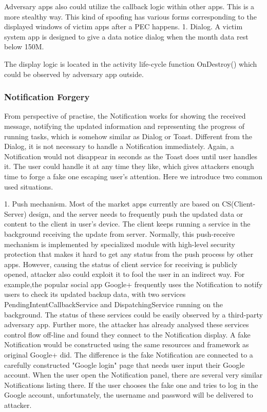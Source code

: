 \documentclass{sig-alternate-05-2015}
\begin{document}
 

Adversary apps also could utilize the callback logic within other apps. This is a more stealthy way. This kind of spoofing has various forms corresponding to the displayed windows of victim apps after a PEC happens.
1. Dialog. A victim system app is designed to give a data notice dialog when the month data rest below 150M. 

The display logic is located in the activity life-cycle function OnDestroy() which could be observed by adversary app outside. 

\subsubsection{Notification Forgery}
From perspective of practise, the Notification works for showing the received message, notifying the updated information and representing the progress of running tasks, which is somehow similar as Dialog or Toast. Different from the Dialog, it is not necessary to handle a Notification immediately. Again, a Notification would not disappear in seconds as the Toast does until user handles it. The user could handle it at any time they like, which gives attackers enough time to forge a fake one escaping user's attention. Here we introduce two common used situations. 

1. Push mechanism. Most of the market apps currently are based on CS(Client-Server) design, and the server needs to frequently push the updated data or content to the client in user's device. The client keeps running a service in the background receiving the update from server. Normally, this push-receive mechanism is implemented by specialized module with high-level security protection that makes it hard to get any status from the push process by other apps. However, causing the status of client service for receiving is publicly opened, attacker also could exploit it to fool the user in an indirect way. For example,the popular social app Google+ frequently uses the Notification to notify users to check its updated backup data, with two services PendingIntentCallbackService and DispatchingService running on the background. The status of these services could be easily observed by a third-party adversary app. Further more, the attacker has already analysed these services control flow off-line and found they connect to the Notification display. A fake Notification would be constructed using the same resources and framework as original Google+ did. The difference is the fake Notification are connected to a carefully constructed "Google login" page that needs user input their Google account. When the user open the Notification panel, there are several very similar Notifications listing there. If the user chooses the fake one and tries to log in the Google account, unfortunately, the username and password will be delivered to attacker.
\end{document}
